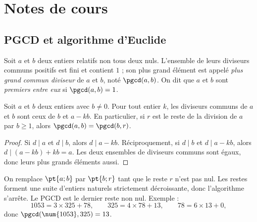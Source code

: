 \mxnewpage
\section{Notes de cours}
\subsection{PGCD et algorithme d'Euclide}
\begin{definition}[PGCD]
Soit $a$ et $b$ deux entiers relatifs non tous deux nuls. L'ensemble de leurs diviseurs communs positifs est fini et contient $1$ ; son plus grand élément est appelé \emph{plus grand commun diviseur} de $a$ et $b$, noté $\pgcd(a,b)$. On dit que $a$ et $b$ sont \emph{premiers entre eux} si $\pgcd(a,b)=1$.
\end{definition}
\begin{theorem}
Soit $a$ et $b$ deux entiers avec $b\neq0$. Pour tout entier $k$, les diviseurs communs de $a$ et $b$ sont ceux de $b$ et $a-kb$. En particulier, si $r$ est le reste de la division de $a$ par $b\ge1$, alors $\pgcd(a,b)=\pgcd(b,r)$.
\end{theorem}
\begin{proof}
Si $d\mid a$ et $d\mid b$, alors $d\mid a-kb$. Réciproquement, si $d\mid b$ et $d\mid a-kb$, alors $d\mid(a-kb)+kb=a$. Les deux ensembles de diviseurs communs sont égaux, donc leurs plus grands éléments aussi.
\end{proof}
\begin{method}
On remplace $\pt{a;b}$ par $\pt{b;r}$ tant que le reste $r$ n'est pas nul. Les restes forment une suite d'entiers naturels strictement décroissante, donc l'algorithme s'arrête. Le PGCD est le dernier reste non nul. Exemple :
\[\num{1053}=3\times325+78,\qquad325=4\times78+13,\qquad78=6\times13+0,\]
donc $\pgcd(\num{1053},325)=13$.
\end{method}

